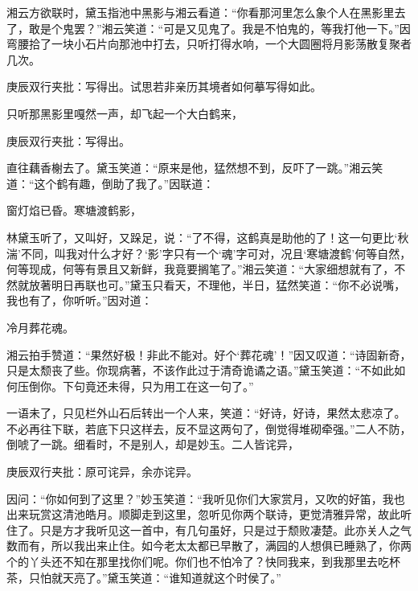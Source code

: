 \begin{parag}
    湘云方欲联时，黛玉指池中黑影与湘云看道：“你看那河里怎么象个人在黑影里去了，敢是个鬼罢？”湘云笑道：“可是又见鬼了。我是不怕鬼的，等我打他一下。”因弯腰拾了一块小石片向那池中打去，只听打得水响，一个大圆圈将月影荡散复聚者几次。\begin{note}庚辰双行夹批：写得出。试思若非亲历其境者如何摹写得如此。\end{note}只听那黑影里嘎然一声，却飞起一个大白鹤来，\begin{note}庚辰双行夹批：写得出。\end{note}直往藕香榭去了。黛玉笑道：“原来是他，猛然想不到，反吓了一跳。”湘云笑道：“这个鹤有趣，倒助了我了。”因联道：
\end{parag}
\begin{poem}
    \begin{pl}

        窗灯焰已昏。寒塘渡鹤影，

    \end{pl}
\end{poem}

\begin{parag}
    林黛玉听了，又叫好，又跺足，说：“了不得，这鹤真是助他的了！这一句更比‘秋湍’不同，叫我对什么才好？‘影’字只有一个‘魂’字可对，况且‘寒塘渡鹤’何等自然，何等现成，何等有景且又新鲜，我竟要搁笔了。”湘云笑道：“大家细想就有了，不然就放著明日再联也可。”黛玉只看天，不理他，半日，猛然笑道：“你不必说嘴，我也有了，你听听。”因对道：
\end{parag}


\begin{poem}
    \begin{pl}
        冷月葬花魂。
    \end{pl}
\end{poem}

\begin{parag}
    湘云拍手赞道：“果然好极！非此不能对。好个‘葬花魂’！”因又叹道：“诗固新奇，只是太颓丧了些。你现病著，不该作此过于清奇诡谲之语。”黛玉笑道：“不如此如何压倒你。下句竟还未得，只为用工在这一句了。”
\end{parag}


\begin{parag}
    一语未了，只见栏外山石后转出一个人来，笑道：“好诗，好诗，果然太悲凉了。不必再往下联，若底下只这样去，反不显这两句了，倒觉得堆砌牵强。”二人不防，倒唬了一跳。细看时，不是别人，却是妙玉。二人皆诧异，\begin{note}庚辰双行夹批：原可诧异，余亦诧异。\end{note}因问：“你如何到了这里？”妙玉笑道：“我听见你们大家赏月，又吹的好笛，我也出来玩赏这清池皓月。顺脚走到这里，忽听见你两个联诗，更觉清雅异常，故此听住了。只是方才我听见这一首中，有几句虽好，只是过于颓败凄楚。此亦关人之气数而有，所以我出来止住。如今老太太都已早散了，满园的人想俱已睡熟了，你两个的丫头还不知在那里找你们呢。你们也不怕冷了？快同我来，到我那里去吃杯茶，只怕就天亮了。”黛玉笑道：“谁知道就这个时侯了。”
\end{parag}


